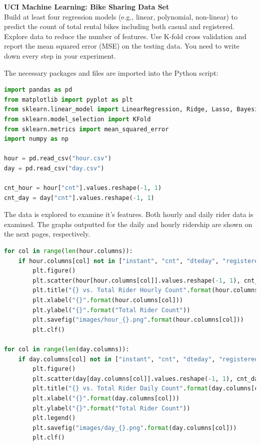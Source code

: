 \documentclass{homework}
\begin{document}
\newpage
\begin{problem}[4]
    \textbf{UCI Machine Learning: Bike Sharing Data Set}\\
    Build at least four regression models (e.g., linear, polynomial, non-linear) to predict the count of total rental bikes including both casual and registered. Explore data to reduce the number of features. Use K-fold cross validation and report the mean squared error (MSE) on the testing data. You need to write down every step in your experiment.
\end{problem}

\begin{solution}

The necessary packages and files are imported into the Python script: 

\begin{lstlisting}[language=Python]
import pandas as pd
from matplotlib import pyplot as plt
from sklearn.linear_model import LinearRegression, Ridge, Lasso, BayesianRidge
from sklearn.model_selection import KFold
from sklearn.metrics import mean_squared_error
import numpy as np

hour = pd.read_csv("hour.csv")
day = pd.read_csv("day.csv")

cnt_hour = hour["cnt"].values.reshape(-1, 1)
cnt_day = day["cnt"].values.reshape(-1, 1)
\end{lstlisting}

The data is explored to examine it's features. Both hourly and daily rider data is examined. The graphs outputted for the daily and hourly ridership are shown on the next pages, respectively. 

\begin{lstlisting}[language=Python]
for col in range(len(hour.columns)):
    if hour.columns[col] not in ["instant", "cnt", "dteday", "registered", "casual"]:
        plt.figure()
        plt.scatter(hour[hour.columns[col]].values.reshape(-1, 1), cnt_hour)
        plt.title("{} vs. Total Rider Hourly Count".format(hour.columns[col]))
        plt.xlabel("{}".format(hour.columns[col]))
        plt.ylabel("{}".format("Total Rider Count"))
        plt.savefig("images/hour_{}.png".format(hour.columns[col]))
        plt.clf()

for col in range(len(day.columns)):
    if day.columns[col] not in ["instant", "cnt", "dteday", "registered", "casual"]:
        plt.figure()
        plt.scatter(day[day.columns[col]].values.reshape(-1, 1), cnt_day)
        plt.title("{} vs. Total Rider Daily Count".format(day.columns[col]))
        plt.xlabel("{}".format(day.columns[col]))
        plt.ylabel("{}".format("Total Rider Count"))
        plt.legend()
        plt.savefig("images/day_{}.png".format(day.columns[col]))
        plt.clf()
\end{lstlisting}


\end{solution}
\end{document}
